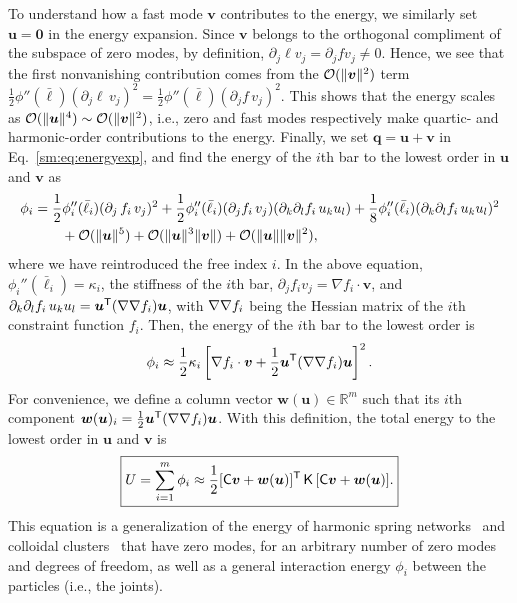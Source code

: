 To understand how a fast mode $\bm{v}$ contributes to the energy, we similarly set $\bm{u} = \bm{0}$ in the energy expansion.
Since $\bm{v}$ belongs to the orthogonal compliment of the subspace of zero modes, by definition, $\partial_j \ell v_j = \partial_j f v_j \ne 0$.
Hence, we see that the first nonvanishing contribution comes from the $\mathcal{O}(\lVert\bm{v}\rVert^2)$ term $\frac{1}{2}\phi''(\bar{\ell})(\partial_j \ell\, v_j)^2 = \frac{1}{2}\phi''(\bar{\ell})(\partial_j f\, v_j)^2$.
This shows that the energy scales as $\mathcal{O}(\lVert\bm{u}\rVert^4) \sim \mathcal{O}(\lVert\bm{v}\rVert^2)$, i.e., zero and fast modes respectively make quartic- and harmonic-order contributions to the energy.
Finally, we set $\bm{q} = \bm{u} + \bm{v}$ in Eq.~\eqref{sm:eq:energyexp}, and find the energy of the $i$th bar to the lowest order in $\bm{u}$ and $\bm{v}$ as
%
\begin{equation}
  \begin{aligned}
    \phi_i &= \frac{1}{2}\phi_i''(\bar{\ell}_i)(\partial_j\, f_i\, v_j)^2 + \frac{1}{2}\phi''_i(\bar{\ell}_i)(\partial_j f_i\, v_j)(\partial_k \partial_l f_i\, u_k u_l) + \frac{1}{8}\phi''_i(\bar{\ell}_i)(\partial_k \partial_l f_i\, u_k u_l)^2\\
           &\qquad+ \mathcal{O}(\lVert\bm{u}\rVert^5) + \mathcal{O}(\lVert\bm{u}\rVert^{3}\lVert\bm{v}\rVert) +\mathcal{O}(\lVert\bm{u}\rVert\lVert\bm{v}\rVert^{2}),
  \end{aligned}
\end{equation}
%
where we have reintroduced the free index $i$.
In the above equation, $\phi_{i}''(\bar{\ell}_i) = \kappa_i$, the stiffness of the $i$th bar, $\partial_j f_i v_j = \nabla f_i\cdot\bm{v}$, and $\partial_k\partial_l f_i\, u_k u_l = \bm{u}^\mathsf{T}(\nabla\nabla f_i)\bm{u}$, with $\nabla\nabla f_i$ being the Hessian matrix of the $i$th constraint function $f_i$.
Then, the energy of the $i$th bar to the lowest order is
%
\begin{equation}
  \phi_i \approx \frac{1}{2}\kappa_i \left[\nabla f_i\cdot\bm{v} + \frac{1}{2}\bm{u}^\mathsf{T}(\nabla\nabla f_i)\bm{u}\right]^2.
\end{equation}
%
For convenience, we define a column vector $\bm{w}(\bm{u}) \in \mathbb{R}^{m}$ such that its $i$th component $\bm{w}(\bm{u})_{i} = \frac{1}{2}\bm{u}^\mathsf{T}(\nabla\nabla f_{i})\bm{u}$.
With this definition, the total energy to the lowest order in $\bm{u}$ and $\bm{v}$ is
%
\begin{equation}\boxed{%
  U = \sum_{i=1}^m \phi_i \approx \frac{1}{2} [\mathsf{C}\bm{v} + \bm{w}(\bm{u})]\trans\,\mathsf{K}\,[\mathsf{C}\bm{v} + \bm{w}(\bm{u})].}
  \label{eq:energy_singular}
\end{equation}
%
This equation is a generalization of the energy of harmonic spring networks~\cite{zhang2016,woodhouse2018} and colloidal clusters~\cite{kallus2017} that have zero modes, for an arbitrary number of zero modes and degrees of freedom, as well as a general interaction energy $\phi_{i}$ between the particles (i.e., the joints).

